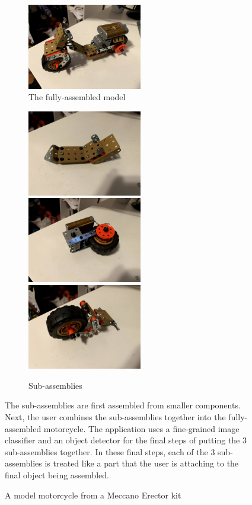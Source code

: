 \begin{figure}
  \begin{subfigure}{\textwidth}
    \includegraphics[width=5cm]{figures/erector/full.jpg}
    \caption{The fully-assembled model}
  \end{subfigure}
  \begin{subfigure}{\textwidth}
    \includegraphics[width=5cm]{figures/erector/sub1.jpg}
    \includegraphics[width=5cm]{figures/erector/sub2.jpg}
    \includegraphics[width=5cm]{figures/erector/sub3.jpg}
    \caption{Sub-assemblies}
  \end{subfigure}
  \begin{captiontext}
    The sub-assemblies are first assembled from smaller components.
    Next, the user combines the sub-assemblies together into the fully-assembled
    motorcycle.
    The application uses a fine-grained image classifier and an object detector
    for the final steps of putting the 3 sub-assemblies together.
    In these final steps, each of the 3 sub-assemblies is treated like a part
    that the user is attaching to the final object being assembled.
  \end{captiontext}
  \caption{A model motorcycle from a Meccano Erector kit
  }\label{fig:erector}
\end{figure}

